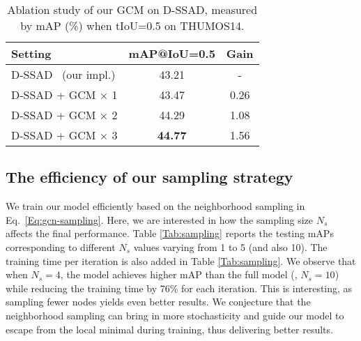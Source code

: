 \documentclass[10pt,journal,compsoc]{IEEEtran}
\begin{document}
\begin{table}[!tb]
	\centering
	\caption{Ablation study of our GCM on D-SSAD, measured by mAP (\%) when tIoU=0.5 on THUMOS14.}
	\begin{tabular}{l|cc}
		\hline
		Setting                & mAP@IoU=0.5     & Gain            \\ \hline
		D-SSAD~\cite{huang2019decoupling} (our impl.)       & 43.21      & -\\
		D-SSAD + GCM $\times$ 1   & 43.47   & 0.26       \\
		D-SSAD  + GCM $\times$ 2  & 44.29   & 1.08      \\
		D-SSAD + GCM $\times$ 3   & \textbf{44.77}  & 1.56 \\ \hline
	\end{tabular}
	\label{Tab:module}
\end{table} 
	
	\subsection{The efficiency of our sampling strategy}
	
	We train our model efficiently based on the neighborhood sampling in Eq.~\eqref{Eq:gcn-sampling}. Here, we are interested in how the sampling size $N_{s}$ affects the final performance. Table \ref{Tab:sampling} reports the testing mAPs corresponding to different $N_s$ values varying from 1 to 5 (and also 10). The training time per iteration is also added in Table \ref{Tab:sampling}. 
	We observe that when $N_{s}=4$, the model achieves higher mAP than the full model (\ie, $N_{s}=10$) while reducing  the training time by 76\% for each iteration. This is interesting, as sampling fewer nodes yields even better results. We conjecture that the neighborhood sampling can bring in more stochasticity and guide our model to escape from the local minimal during training, thus delivering better results.
	

	

	
	
	
\end{document}
